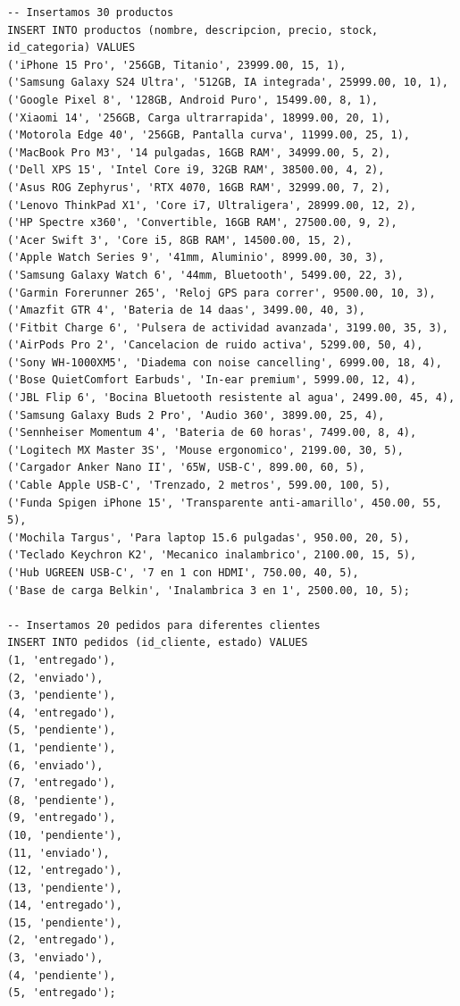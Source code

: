 \documentclass[12pt,a4paper]{article}
\begin{document}
\begin{lstlisting}
-- Insertamos 30 productos
INSERT INTO productos (nombre, descripcion, precio, stock, id_categoria) VALUES 
('iPhone 15 Pro', '256GB, Titanio', 23999.00, 15, 1),
('Samsung Galaxy S24 Ultra', '512GB, IA integrada', 25999.00, 10, 1),
('Google Pixel 8', '128GB, Android Puro', 15499.00, 8, 1),
('Xiaomi 14', '256GB, Carga ultrarrapida', 18999.00, 20, 1),
('Motorola Edge 40', '256GB, Pantalla curva', 11999.00, 25, 1),
('MacBook Pro M3', '14 pulgadas, 16GB RAM', 34999.00, 5, 2),
('Dell XPS 15', 'Intel Core i9, 32GB RAM', 38500.00, 4, 2),
('Asus ROG Zephyrus', 'RTX 4070, 16GB RAM', 32999.00, 7, 2),
('Lenovo ThinkPad X1', 'Core i7, Ultraligera', 28999.00, 12, 2),
('HP Spectre x360', 'Convertible, 16GB RAM', 27500.00, 9, 2),
('Acer Swift 3', 'Core i5, 8GB RAM', 14500.00, 15, 2),
('Apple Watch Series 9', '41mm, Aluminio', 8999.00, 30, 3),
('Samsung Galaxy Watch 6', '44mm, Bluetooth', 5499.00, 22, 3),
('Garmin Forerunner 265', 'Reloj GPS para correr', 9500.00, 10, 3),
('Amazfit GTR 4', 'Bateria de 14 daas', 3499.00, 40, 3),
('Fitbit Charge 6', 'Pulsera de actividad avanzada', 3199.00, 35, 3),
('AirPods Pro 2', 'Cancelacion de ruido activa', 5299.00, 50, 4),
('Sony WH-1000XM5', 'Diadema con noise cancelling', 6999.00, 18, 4),
('Bose QuietComfort Earbuds', 'In-ear premium', 5999.00, 12, 4),
('JBL Flip 6', 'Bocina Bluetooth resistente al agua', 2499.00, 45, 4),
('Samsung Galaxy Buds 2 Pro', 'Audio 360', 3899.00, 25, 4),
('Sennheiser Momentum 4', 'Bateria de 60 horas', 7499.00, 8, 4),
('Logitech MX Master 3S', 'Mouse ergonomico', 2199.00, 30, 5),
('Cargador Anker Nano II', '65W, USB-C', 899.00, 60, 5),
('Cable Apple USB-C', 'Trenzado, 2 metros', 599.00, 100, 5),
('Funda Spigen iPhone 15', 'Transparente anti-amarillo', 450.00, 55, 5),
('Mochila Targus', 'Para laptop 15.6 pulgadas', 950.00, 20, 5),
('Teclado Keychron K2', 'Mecanico inalambrico', 2100.00, 15, 5),
('Hub UGREEN USB-C', '7 en 1 con HDMI', 750.00, 40, 5),
('Base de carga Belkin', 'Inalambrica 3 en 1', 2500.00, 10, 5);

-- Insertamos 20 pedidos para diferentes clientes
INSERT INTO pedidos (id_cliente, estado) VALUES 
(1, 'entregado'), 
(2, 'enviado'), 
(3, 'pendiente'), 
(4, 'entregado'), 
(5, 'pendiente'),
(1, 'pendiente'), 
(6, 'enviado'), 
(7, 'entregado'), 
(8, 'pendiente'), 
(9, 'entregado'),
(10, 'pendiente'), 
(11, 'enviado'), 
(12, 'entregado'), 
(13, 'pendiente'), 
(14, 'entregado'),
(15, 'pendiente'), 
(2, 'entregado'), 
(3, 'enviado'), 
(4, 'pendiente'), 
(5, 'entregado');


\end{lstlisting}
\end{document}
